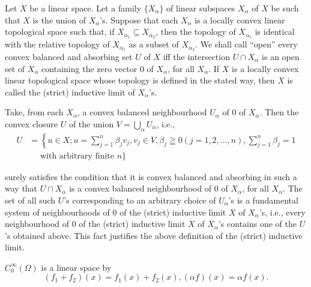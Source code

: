 \begin{definition}\label{def:I.1.Definition.6} 
 Let $X$ be a linear space. Let a family $\{X_{\alpha}\}$ of linear subspaces $X_{\alpha}$ of $X$ be such that $X$ is the union of $X_{\alpha}$'s. Suppose that each $X_{\alpha}$ is a locally convex linear topological space such that, if $X_{\alpha_{1}} \subseteq X_{\alpha_{2}}$, then the topology of $X_{\alpha_{1}}$ is identical with the relative topology of $X_{\alpha_{1}}$ as a subset of $X_{\alpha_{2}}$. We shall call ``open'' every convex balanced and absorbing set $U$ of $X$ iff the intersection $U \cap X_{\alpha}$ is an open set of $X_{\alpha}$ containing the zero vector $0$ of $X_{\alpha}$, for all $X_{\alpha}$. If $X$ is a locally convex linear topological space whose topology is defined in the stated way, then $X$ is called the (strict) inductive limit of $X_{\alpha}$'s. 
\end{definition}

\begin{remarku} Take, from each $X_{\alpha}$, a convex balanced neighbourhood $U_{\alpha}$ of $0$ of $X_{\alpha}$. Then the convex closure $U$ of the union $V = \bigcup\limits_{\alpha} U_{\alpha}$, i.e., 
\[
\begin{aligned}
U& = \left\{u \in X; u = \sum\limits_{j=1} ^{n} \beta_{j} v_{j}, v_{j} \in V, \beta_{j} \geqq 0 (j = 1, 2, \dots , n), \sum\limits_{j=1} ^{n} \beta_{j} = 1 \right.
\\
&\quad \text{ with arbitrary finite } n \Bigg \}
\end{aligned}
\]
\end{remarku}

surely satisfies the condition that it is convex balanced and absorbing in such a way that $U \cap X_{\alpha}$ is a convex balanced neighbourhood of $0$ of $X_{\alpha}$, for all $X_{\alpha}$. The set of all such $U$'s corresponding to an arbitrary choice of $U_{\alpha}$'s is a fundamental system of neighbourhoods of $0$ of the (strict) inductive limit $X$ of $X_{\alpha}$'s, i.e., every neighbourhood of $0$ of the (strict) inductive limit $X$ of $X_{\alpha}$'s contains one of the $U$'s obtained above. This fact justifies the above definition of the (strict) inductive limit. 


$C_0^\infty (\Omega)$ is a linear space by 
\[
\left(f_{1} + f_{2}\right) (x) = f_{1} (x) + f_{2} (x), (\alpha f) (x) = \alpha f (x).
\]

